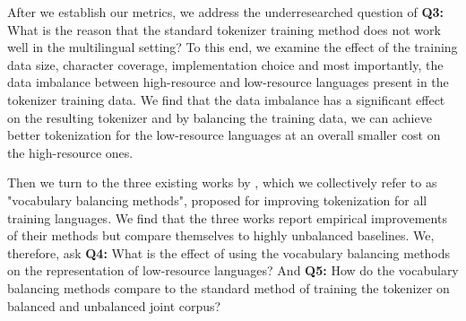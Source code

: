 After we establish our metrics, we address the underresearched question of \textbf{Q3:} What is the reason that the standard tokenizer training method does not work well in the multilingual setting? To this end, we examine the effect of the training data size, character coverage, implementation choice and most importantly, the data imbalance between high-resource and low-resource languages present in the tokenizer training data. We find that the data imbalance has a significant effect on the resulting tokenizer and by balancing the training data, we can achieve better tokenization for the low-resource languages at an overall smaller cost on the high-resource ones.


%  

Then we turn to the three existing works by \citet{chung_improving_2020,zheng_allocating_2021,liang_xlm-v_2023}, which we collectively refer to as "vocabulary balancing methods", proposed for improving tokenization for all training languages. We find that the three works report empirical improvements of their methods but compare themselves to highly unbalanced baselines. We, therefore, ask \textbf{Q4:} What is the effect of using the vocabulary balancing methods on the representation of low-resource languages? And
\textbf{Q5:} How do the vocabulary balancing methods compare to the standard method of training the tokenizer on balanced and unbalanced joint corpus?

